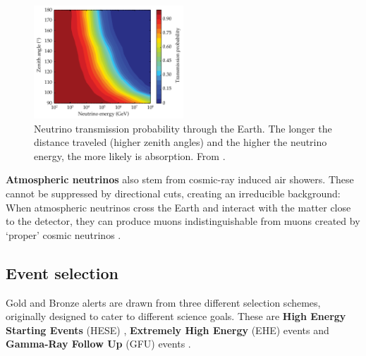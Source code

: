 \documentclass[
    a4paper, %
    fontsize=10pt, %
    twoside=false, %
    numbers=noenddot, %
    fontmethod=tex,
]{kaobook}
\begin{document}
\begin{figure}[htb]
    \includegraphics[width=0.5\textwidth]{ic/ic_absorption_earth.pdf}
    \caption[Neutrino absorption in the Earth]{Neutrino transmission probability through the Earth. The longer the distance traveled (higher zenith angles) and the higher the neutrino energy, the more likely is absorption. From \cite{Aartsen2017c}.}
\end{figure}

\textbf{Atmospheric neutrinos} also stem from cosmic-ray induced air showers. These cannot be suppressed by directional cuts, creating an irreducible background: When atmospheric neutrinos cross the Earth and interact with the matter close to the detector, they can produce muons indistinguishable from muons created by `proper' cosmic neutrinos \cite{Ahlers2018a}.

\subsection{Event selection} \label{ic_event_selection}

Gold and Bronze alerts are drawn from three different selection schemes, originally designed to cater to different science goals. These are \textbf{High Energy Starting Events} (HESE) , \textbf{Extremely High Energy} (EHE) events  and \textbf{Gamma-Ray Follow Up} (GFU) events .
\end{document}
